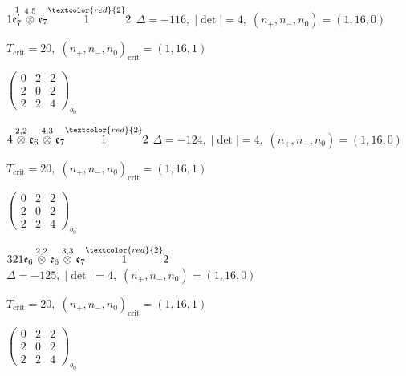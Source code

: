 \documentclass[10pt]{article}
\begin{document}
\smallskip

$1\overset{1}{\mathfrak{e}_7'}\overset{4,5}{\otimes}\mathfrak{e}_7\overset{\textcolor{red}{2}}{1}2$ \quad $\Delta=-116,\; |\det|=4,\; (n_+,n_-,n_0)=(1,16,0)$

\hspace{1em}$T_{\text{crit}}=20,\; (n_+,n_-,n_0)_{\text{crit}}=(1,16,1)$

\hspace{2em}$\left(\begin{smallmatrix}0 & 2 & 2 \\ 2 & 0 & 2 \\ 2 & 2 & 4\end{smallmatrix}\right)_{\!b_0}$

\smallskip

$4\overset{2,2}{\otimes}\mathfrak{e}_6\overset{4,3}{\otimes}\mathfrak{e}_7\overset{\textcolor{red}{2}}{1}2$ \quad $\Delta=-124,\; |\det|=4,\; (n_+,n_-,n_0)=(1,16,0)$

\hspace{1em}$T_{\text{crit}}=20,\; (n_+,n_-,n_0)_{\text{crit}}=(1,16,1)$

\hspace{2em}$\left(\begin{smallmatrix}0 & 2 & 2 \\ 2 & 0 & 2 \\ 2 & 2 & 4\end{smallmatrix}\right)_{\!b_0}$

\smallskip

$321\mathfrak{e}_6\overset{2,2}{\otimes}\mathfrak{e}_6\overset{3,3}{\otimes}\mathfrak{e}_7\overset{\textcolor{red}{2}}{1}2$ \quad $\Delta=-125,\; |\det|=4,\; (n_+,n_-,n_0)=(1,16,0)$

\hspace{1em}$T_{\text{crit}}=20,\; (n_+,n_-,n_0)_{\text{crit}}=(1,16,1)$

\hspace{2em}$\left(\begin{smallmatrix}0 & 2 & 2 \\ 2 & 0 & 2 \\ 2 & 2 & 4\end{smallmatrix}\right)_{\!b_0}$
\end{document}
